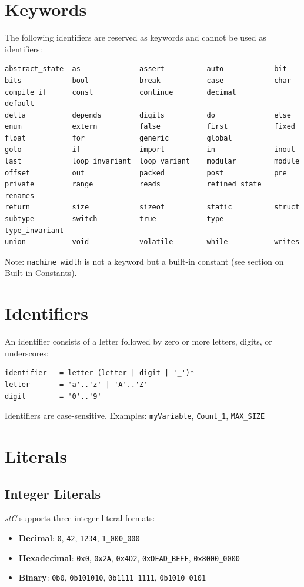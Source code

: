 \documentclass[11pt,letterpaper,twoside,openany]{book}
\begin{document}
\section{Keywords}
The following identifiers are reserved as keywords and cannot be used as identifiers:

\begin{lstlisting}
abstract_state  as              assert          auto            bit
bits            bool            break           case            char
compile_if      const           continue        decimal         default
delta           depends         digits          do              else
enum            extern          false           first           fixed
float           for             generic         global
goto            if              import          in              inout
last            loop_invariant  loop_variant    modular         module
offset          out             packed          post            pre
private         range           reads           refined_state   renames
return          size            sizeof          static          struct
subtype         switch          true            type            type_invariant
union           void            volatile        while           writes
\end{lstlisting}

Note: \verb'machine_width' is not a keyword but a built-in constant (see section on Built-in Constants).

\section{Identifiers}
An identifier consists of a letter followed by zero or more letters, digits, or underscores:
\begin{lstlisting}
identifier   = letter (letter | digit | '_')*
letter       = 'a'..'z' | 'A'..'Z'
digit        = '0'..'9'
\end{lstlisting}

Identifiers are case-sensitive. Examples: \verb'myVariable', \verb'Count_1', \verb'MAX_SIZE'

\section{Literals}

\subsection{Integer Literals}
\emph{stC} supports three integer literal formats:
\begin{itemize}
\item \textbf{Decimal}: \verb'0', \verb'42', \verb'1234', \verb'1_000_000'
\item \textbf{Hexadecimal}: \verb'0x0', \verb'0x2A', \verb'0x4D2', \verb'0xDEAD_BEEF', \verb'0x8000_0000'
\item \textbf{Binary}: \verb'0b0', \verb'0b101010', \verb'0b1111_1111', \verb'0b1010_0101'
\end{itemize}
\end{document}
